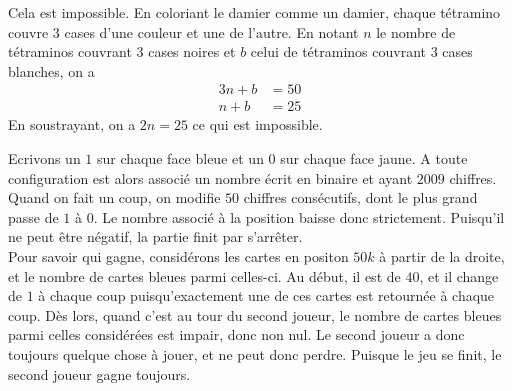 \begin{sol}
Cela est impossible. En coloriant le damier comme un damier, chaque tétramino couvre $3$ cases d'une couleur et une de l'autre. En notant $n$ le nombre de tétraminos couvrant $3$ cases noires et $b$ celui de tétraminos couvrant $3$ cases blanches, on a
\begin{align*}
3n+b&=50\\
n+b&=25
\end{align*}
En soustrayant, on a $2n=25$ ce qui est impossible.
\end{sol}

\begin{sol}
Ecrivons un $1$ sur chaque face bleue et un $0$ sur chaque face jaune. A toute configuration est alors associé un nombre écrit en binaire et ayant $2009$ chiffres. Quand on fait un coup, on modifie $50$ chiffres consécutifs, dont le plus grand passe de $1$ à $0$. Le nombre associé à la position baisse donc strictement. Puisqu'il ne peut être négatif, la partie finit par s'arrêter.\\
Pour savoir qui gagne, considérons les cartes en positon $50k$ à partir de la droite, et le nombre de cartes bleues parmi celles-ci. Au début, il est de $40$, et il change de $1$ à chaque coup puisqu'exactement une de ces cartes est retournée à chaque coup. Dès lors, quand c'est au tour du second joueur, le nombre de cartes bleues parmi celles considérées est impair, donc non nul. Le second joueur a donc toujours quelque chose à jouer, et ne peut donc perdre. Puisque le jeu se finit, le second joueur gagne toujours.
\end{sol}


